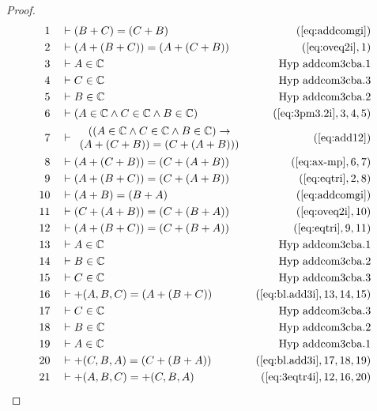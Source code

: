 \begin{proof}
\begin{align}
  1 &&  & \vdash ( B + C ) = ( C + B )&(\mbox{\ref{eq:addcomgi}})\notag
  \\ 2 &&  & \vdash ( A + ( B + C ) ) = ( A + ( C + B )
     )&(\mbox{\ref{eq:oveq2i}},1)\notag
  \\ 3 &&  & \vdash A \in
\mathbb{C}&\text{Hyp~addcom3cba.1}\notag%
  \\ 4 &&  & \vdash C \in
\mathbb{C}&\text{Hyp~addcom3cba.3}\notag%
  \\ 5 &&  & \vdash B \in
\mathbb{C}&\text{Hyp~addcom3cba.2}\notag%
  \\ 6 &&  & \vdash ( A \in \mathbb{C} \wedge C \in \mathbb{C} \wedge B \in
     \mathbb{C} )&(\mbox{\ref{eq:3pm3.2i}},3,4,5)\notag
  \\ 7 &&  & \vdash 
     \begin{array}{c}
     ( ( A \in \mathbb{C} \wedge C \in \mathbb{C} \wedge B \in
     \mathbb{C} ) \rightarrow \\
      ( A + ( C + B ) ) = ( C + ( A + B ) ) )
     \end{array}
     &(\mbox{\ref{eq:add12}})\notag
  \\ 8 &&  & \vdash ( A + ( C + B ) ) = ( C + ( A + B )
     )&(\mbox{\ref{eq:ax-mp}},6,7)\notag
  \\ 9 &&  & \vdash ( A + ( B + C ) ) = ( C + ( A + B )
     )&(\mbox{\ref{eq:eqtri}},2,8)\notag
  \\ 10 &&  & \vdash ( A + B ) = ( B + A )&(\mbox{\ref{eq:addcomgi}})\notag
  \\ 11 &&  & \vdash ( C + ( A + B ) ) = ( C + ( B + A )
     )&(\mbox{\ref{eq:oveq2i}},10)\notag
  \\ 12 &&  & \vdash ( A + ( B + C ) ) = ( C + ( B + A )
     )&(\mbox{\ref{eq:eqtri}},9,11)\notag
  \\ 13 &&  & \vdash A \in
\mathbb{C}&\text{Hyp~addcom3cba.1}\notag%
  \\ 14 &&  & \vdash B \in
\mathbb{C}&\text{Hyp~addcom3cba.2}\notag%
  \\ 15 &&  & \vdash C \in
\mathbb{C}&\text{Hyp~addcom3cba.3}\notag%
  \\ 16 &&  & \vdash +( A , B , C ) = ( A + ( B + C )
     )&(\mbox{\ref{eq:bl.add3i}},13,14,15)\notag
  \\ 17 &&  & \vdash C \in
\mathbb{C}&\text{Hyp~addcom3cba.3}\notag%
  \\ 18 &&  & \vdash B \in
\mathbb{C}&\text{Hyp~addcom3cba.2}\notag%
  \\ 19 &&  & \vdash A \in
\mathbb{C}&\text{Hyp~addcom3cba.1}\notag%
  \\ 20 &&  & \vdash +( C , B , A ) = ( C + ( B + A )
     )&(\mbox{\ref{eq:bl.add3i}},17,18,19)\notag
  \\ 21 &&  & \vdash +( A , B , C ) = +( C , B , A
     )&(\mbox{\ref{eq:3eqtr4i}},12,16,20)\notag
\end{align}
\end{proof}

